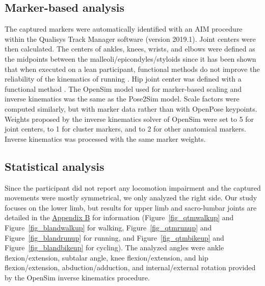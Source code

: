 \subsection{Marker-based analysis}

The captured markers were automatically identified with an AIM procedure within the Qualisys Track Manager software (version 2019.1). Joint centers were then calculated. The centers of ankles, knees, wrists, and elbows were defined as the midpoints between the malleoli/epicondyles/styloids since it has been shown that when executed on a lean participant, functional methods do not improve the reliability of the kinematics of running \cite{Pohl2010}. Hip joint center was defined with a functional method \cite{Halvorsen2003}. The OpenSim model used for marker-based scaling and inverse kinematics was the same as the Pose2Sim model. Scale factors were computed similarly, but with marker data rather than with OpenPose keypoints. Weights proposed by the inverse kinematics solver of OpenSim were set to 5 for joint centers, to 1 for cluster markers, and to 2 for other anatomical markers. Inverse kinematics was processed with the same marker weights.


\subsection{Statistical analysis} \label{stats_accuracy}

Since the participant did not report any locomotion impairment and the captured movements were mostly symmetrical, we only analyzed the right side. Our study focuses on the lower limb, but results for upper limb and sacro-lumbar joints are detailed in the \hyperref[Ann:2]{Appendix B} for information (Figure~\ref{fig_qtmwalkup} and Figure~\ref{fig_blandwalkup} for walking, Figure~\ref{fig_qtmrunup} and Figure~\ref{fig_blandrunup} for running, and Figure~\ref{fig_qtmbikeup} and Figure~\ref{fig_blandbikeup} for cycling). The analyzed angles were ankle flexion/extension, subtalar angle, knee flexion/extension, and hip flexion/extension, abduction/adduction, and internal/external rotation provided by the OpenSim inverse kinematics procedure.

